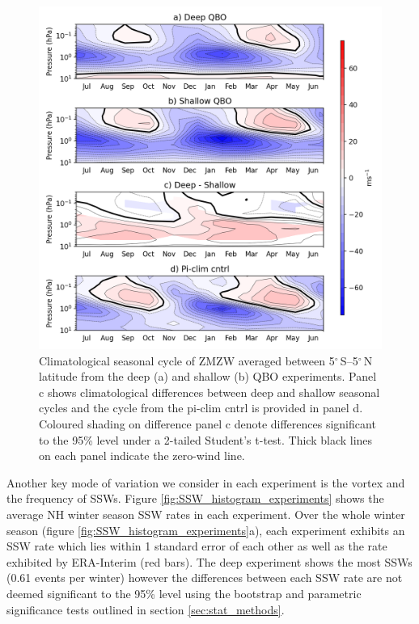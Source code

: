 \begin{figure}[h!]
\begin{center}
\noindent\includegraphics[width = 0.75\linewidth]{Figures/Figures-deepQBO/SAO_seasonal_cycles.png}
\caption[Climatological seasonal cycle of the SAO in QBO experiments]{Climatological seasonal cycle of ZMZW averaged between 5$^{\circ}$\,S--5$^{\circ}$\,N latitude from the deep (a) and shallow (b) QBO experiments. Panel c shows climatological differences between deep and shallow seasonal cycles and the cycle from the pi-clim cntrl is provided in panel d. Coloured shading on difference panel c denote differences significant to the 95\% level under a 2-tailed Student's t-test. Thick black lines on each panel indicate the zero-wind line.}
\label{fig:experiment_SAOs}
\end{center}
\end{figure}

Another key mode of variation we consider in each experiment is the vortex and the frequency of SSWs. Figure \ref{fig:SSW_histogram_experiments} shows the average NH winter season SSW rates in each experiment. Over the whole winter season (figure \ref{fig:SSW_histogram_experiments}a), each experiment exhibits an SSW rate which lies within 1 standard error of each other as well as the rate exhibited by ERA-Interim (red bars). The deep experiment shows the most SSWs (0.61 events per winter) however the differences between each SSW rate are not deemed significant to the 95\% level using the bootstrap and parametric significance tests outlined in section \ref{sec:stat_methods}. 

